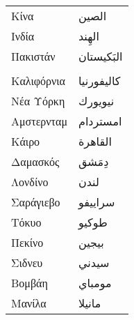 \documentclass[twocolumn,a4paper]{article}
\newcommand{\ar}[1]{\textarabic{#1}}
\begin{document}
\begin{mpsupertabular}{ P{0.5\textwidth} P{0.5\textwidth} }
Κίνα         & \ar{ الصين } \\
Ινδία        & \ar{ الهِند } \\
Πακιστάν     & \ar{ البَكيستان } \\
\\
Καλιφόρνια   & \ar{ كاليفورنيا } \\
Νέα Υόρκη    & \ar{ نيويورك } \\
Αμστερνταμ   & \ar{ امستردام } \\
Κάιρο        & \ar{ القاهرة } \\
Δαμασκός     & \ar{ دِمَشق } \\
Λονδίνο      & \ar{ لندن } \\
Σαράγιεβο    & \ar{ سراييفو } \\
Τόκυο        & \ar{ طوكيو } \\
Πεκίνο       & \ar{ بيجين } \\
Σιδνευ       & \ar{ سيدني } \\
Βομβάη       & \ar{ مومباي } \\
Μανίλα       & \ar{ مانيلا } \\



\end{mpsupertabular}
\end{document}
